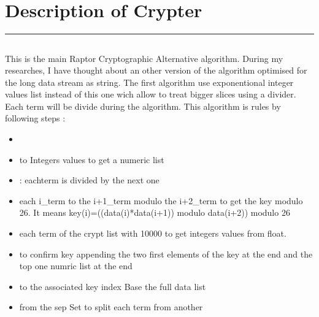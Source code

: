 \documentclass[letterpaper,10pt,english]{sphinxmanual}
\begin{document}
\section{Description of Crypter}
\label{\detokenize{Description of AltCrypterv1:description-of-crypter}}\label{\detokenize{Description of AltCrypterv1::doc}}
\sphinxAtStartPar
{}


\bigskip\hrule\bigskip



\subsection{}
\label{\detokenize{Description of AltCrypterv1:algorithm}}
\sphinxAtStartPar
This is the main Raptor Cryptographic Alternative algorithm.
During my researches, I have thought about an other version of the algorithm optimised for the long data stream as string.
The first algorithm use exponentional integer values list instead of this one wich allow to treat bigger slices using a divider.
Each term will be divide during the algorithm.
This algorithm is rules by following steps :
\begin{itemize}
\item {} 
\sphinxAtStartPar
{}

\item {} 
\sphinxAtStartPar
{} to Integers values to get a numeric list

\item {} 
\sphinxAtStartPar
{} : eachterm is divided by the next one

\item {} 
\sphinxAtStartPar
{} each i\_term to the i+1\_term modulo the i+2\_term to get the key modulo 26. It means key(i)=((data(i)*data(i+1)) modulo data(i+2)) modulo 26

\item {} 
\sphinxAtStartPar
{} each term of the crypt list with 10000 to get integers values from float.

\item {} 
\sphinxAtStartPar
{} to confirm key appending the two first elements of the key at the end and the top one numric list at the end

\item {} 
\sphinxAtStartPar
{} to the associated key index Base the full data list

\item {} 
\sphinxAtStartPar
{} from the sep Set to split each term from another

\end{itemize}
\end{document}
